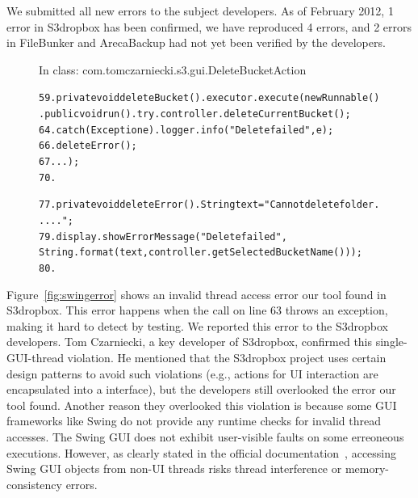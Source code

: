 We submitted all \newbugs new errors
to the subject developers. As of February 2012, 1 error in S3dropbox has been confirmed,
we have reproduced 4 errors, and 2 errors in FileBunker and ArecaBackup
had not yet been verified by the developers.



\begin{figure}[t]
\hspace{4mm}\small{In class: com.tomczarniecki.s3.gui.DeleteBucketAction}
\vspace{-2mm}
\begin{CodeOut}
\begin{alltt}
59.private void deleteBucket() .    executor.execute(new Runnable() .        public void run() .            try .                controller.deleteCurrentBucket();
64.            {\ttrcb} catch (Exception e) .                logger.info("Delete failed", e);
66.                deleteError(); 
67.            .       .    \ttrcb);
70.\ttrcb

77.private void deleteError() .    String text = "Cannot delete folder .....";
79.    display.showErrorMessage("Delete failed", 
        String.format(text, controller.getSelectedBucketName())); 
80.\ttrcb
\end{alltt}
\end{CodeOut}
\vspace*{-15pt}
\end{figure}

Figure~\ref{fig:swingerror}
shows an invalid thread access error our tool found in S3dropbox.
This error happens when the 
call on line 63 throws an exception, making it hard to
detect by testing. We reported this error to the S3dropbox developers. Tom Czarniecki,
a key developer of S3dropbox, confirmed this single-GUI-thread
violation. He mentioned that the S3dropbox project uses
certain design patterns to avoid such violations (e.g.,
actions for UI interaction are encapsulated into a  interface),
but the developers still overlooked  the error our tool found.
Another reason they overlooked this violation is because some GUI frameworks like Swing
do not provide any runtime checks for invalid thread accesses. The Swing
GUI does not exhibit user-visible faults on some erreoneous executions.
However, as clearly stated in the official documentation~\cite{swing}, %
accessing Swing GUI objects from non-UI threads risks thread interference
or memory-consistency errors.




